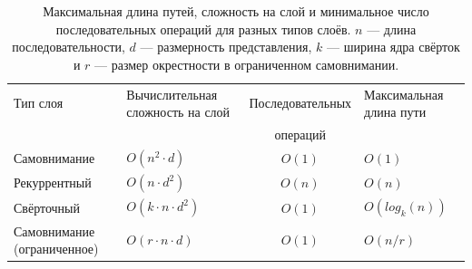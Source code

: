 \documentclass{article}
\begin{document}

\begin{table}[t]
\caption{
  Максимальная длина путей, сложность на слой и минимальное число последовательных операций для разных типов слоёв. $n$ — длина последовательности, $d$ — размерность представления, $k$ — ширина ядра свёрток и $r$ — размер окрестности в ограниченном самовнимании.}
\label{tab:op_complexities}
\begin{center}
\vspace{-1mm}

\begin{tabularx}{\textwidth}{YYcY}
\toprule
Тип слоя & Вычислительная сложность на слой & Последовательных & Максимальная длина пути  \\
           &             & операций &   \\
\hline
\rule{0pt}{2.0ex}Самовнимание & $O(n^2 \cdot d)$ & $O(1)$ & $O(1)$ \\
Рекуррентный & $O(n \cdot d^2)$ & $O(n)$ & $O(n)$ \\

Свёрточный & $O(k \cdot n \cdot d^2)$ & $O(1)$ & $O(log_k(n))$ \\
Самовнимание (ограниченное)& $O(r \cdot n \cdot d)$ & $O(1)$ & $O(n/r)$ \\





\bottomrule
\end{tabularx}
\end{center}
\end{table}
\end{document}
